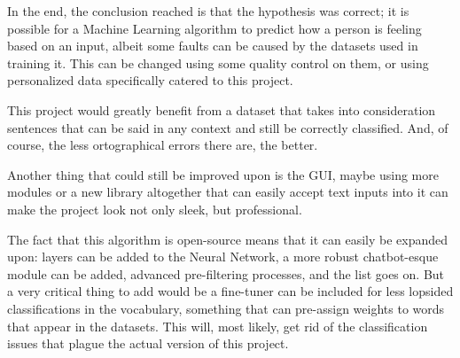 \documentclass[review]{elsarticle} %
\begin{document}
In the end, the conclusion reached is that the hypothesis was correct; it is possible for a Machine Learning algorithm to predict how a person is feeling based on an input, albeit some faults can be caused by the datasets used in training it. This can be changed using some quality control on them, or using personalized data specifically catered to this project.

This project would greatly benefit from a dataset that takes into consideration sentences that can be said in any context and still be correctly classified. And, of course, the less ortographical errors there are, the better.

Another thing that could still be improved upon is the GUI, maybe using more modules or a new library altogether that can easily accept text inputs into it can make the project look not only sleek, but professional.

The fact that this algorithm is open-source means that it can easily be expanded upon: layers can be added to the Neural Network, a more robust chatbot-esque module can be added, advanced pre-filtering processes, and the list goes on. But a very critical thing to add would be a fine-tuner can be included for less lopsided classifications in the vocabulary, something that can pre-assign weights to words that appear in the datasets. This will, most likely, get rid of the classification issues that plague the actual version of this project.



\end{document}
